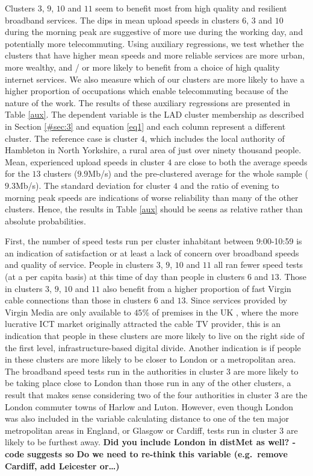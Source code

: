 \documentclass[]{interact}
\theoremstyle{plain}%
\theoremstyle{definition}
\theoremstyle{remark}
\begin{document}
Clusters \(3\), \(9\), \(10\) and \(11\) seem to benefit most from high
quality and resilient broadband services. The dips in mean upload speeds
in clusters \(6\), \(3\) and \(10\) during the morning peak are
suggestive of more use during the working day, and potentially more
telecommuting. Using auxiliary regressions, we test whether the clusters
that have higher mean speeds and more reliable services are more urban,
more wealthy, and / or more likely to benefit from a choice of high
quality internet services. We also measure which of our clusters are
more likely to have a higher proportion of occupations which enable
telecommuting because of the nature of the work. The results of these
auxiliary regressions are presented in Table \ref{aux}. The dependent
variable is the LAD cluster membership as described in Section
\ref{#sec:3} and equation \ref{eq1} and each column represent a
different cluster. The reference case is cluster \(4\), which includes
the local authority of Hambleton in North Yorkshire, a rural area of
just over ninety thousand people. Mean, experienced upload speeds in
cluster \(4\) are close to both the average speeds for the \(13\)
clusters (\(9.9\)Mb/s) and the pre-clustered average for the whole
sample (\(9.3\)Mb/s). The standard deviation for cluster \(4\) and the
ratio of evening to morning peak speeds are indications of worse
reliability than many of the other clusters. Hence, the results in Table
\ref{aux} should be seens as relative rather than absolute
probabilities.

First, the number of speed tests run per cluster inhabitant between
9:00-10:59 is an indication of satisfaction or at least a lack of
concern over broadband speeds and quality of service. People in clusters
\(3\), \(9\), \(10\) and \(11\) all ran fewer speed tests (at a per
capita basis) at this time of day than people in clusters \(6\) and
\(13\). Those in clusters \(3\), \(9\), \(10\) and \(11\) also benefit
from a higher proportion of fast Virgin cable connections than those in
clusters \(6\) and \(13\). Since services provided by Virgin Media are
only available to \(45\)\% of premises in the UK \citep{ofcom2016},
where the more lucrative ICT market originally attracted the cable TV
provider, this is an indication that people in these clusters are more
likely to live on the right side of the first level,
infrastructure-based digital divide. Another indication is if people in
these clusters are more likely to be closer to London or a metropolitan
area. The broadband speed tests run in the authorities in cluster \(3\)
are more likely to be taking place close to London than those run in any
of the other clusters, a result that makes sense considering two of the
four authorities in cluster \(3\) are the London commuter towns of
Harlow and Luton. However, even though London was also included in the
variable calculating distance to one of the ten major metropolitan areas
in England, or Glasgow or Cardiff, tests run in cluster \(3\) are likely
to be furthest away. \textbf{Did you include London in distMet as well?
- code suggests so} \textbf{Do we need to re-think this variable
(e.g.~remove Cardiff, add Leicester or\ldots)}
\end{document}
